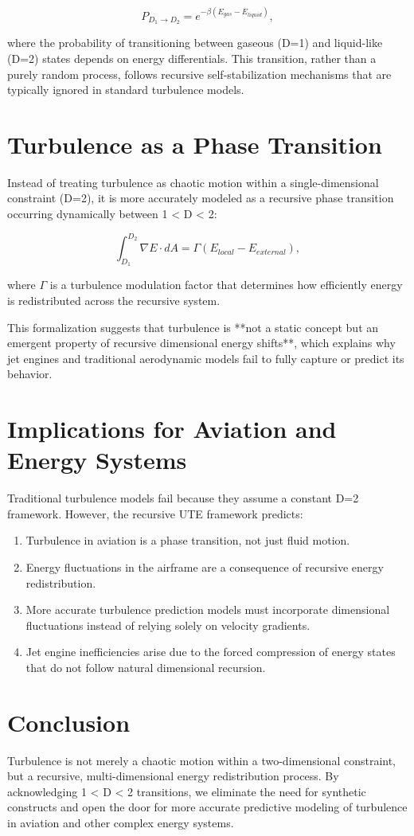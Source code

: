 \documentclass[letterpaper,12pt]{article}
\begin{document}
\begin{equation}
    P_{D_1 \to D_2} = e^{-\beta (E_{gas} - E_{liquid})},
\end{equation}

where the probability of transitioning between gaseous (D=1) and liquid-like (D=2) states depends on energy differentials. This transition, rather than a purely random process, follows recursive self-stabilization mechanisms that are typically ignored in standard turbulence models.

\section{Turbulence as a Phase Transition}
Instead of treating turbulence as chaotic motion within a single-dimensional constraint (D=2), it is more accurately modeled as a recursive phase transition occurring dynamically between 1 < D < 2:

\begin{equation}
    \int_{D_1}^{D_2} \nabla E \cdot dA = \Gamma \left( E_{local} - E_{external} \right),
\end{equation}

where $\Gamma$ is a turbulence modulation factor that determines how efficiently energy is redistributed across the recursive system.

This formalization suggests that turbulence is **not a static concept but an emergent property of recursive dimensional energy shifts**, which explains why jet engines and traditional aerodynamic models fail to fully capture or predict its behavior.

\section{Implications for Aviation and Energy Systems}
Traditional turbulence models fail because they assume a constant D=2 framework. However, the recursive UTE framework predicts:

\begin{enumerate}
    \item Turbulence in aviation is a phase transition, not just fluid motion.
    \item Energy fluctuations in the airframe are a consequence of recursive energy redistribution.
    \item More accurate turbulence prediction models must incorporate dimensional fluctuations instead of relying solely on velocity gradients.
    \item Jet engine inefficiencies arise due to the forced compression of energy states that do not follow natural dimensional recursion.
\end{enumerate}

\section{Conclusion}
Turbulence is not merely a chaotic motion within a two-dimensional constraint, but a recursive, multi-dimensional energy redistribution process. By acknowledging 1 < D < 2 transitions, we eliminate the need for synthetic constructs and open the door for more accurate predictive modeling of turbulence in aviation and other complex energy systems.
\end{document}
